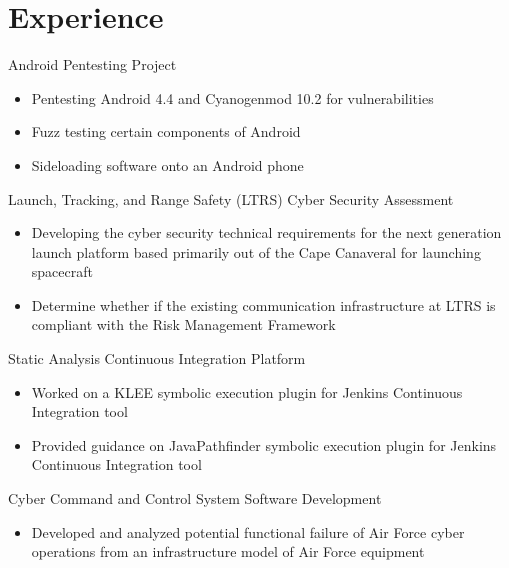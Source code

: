 \documentclass[letterpaper]{clinton-resume}
\begin{document}
\begin{minipage}[t]{0.66\textwidth}
\section{Experience}
\vspace{\topsep} 
\begin{tightitemize}
\item Android Pentesting Project
	\begin{itemize}
		\item Pentesting Android 4.4 and Cyanogenmod 10.2 for vulnerabilities
		\item Fuzz testing certain components of Android
		\item Sideloading software onto an Android phone
	\end{itemize}
\item Launch, Tracking, and Range Safety (LTRS) Cyber Security Assessment
	\begin{itemize}
		\item Developing the cyber security technical requirements for the next generation launch platform based primarily out of the Cape Canaveral for launching spacecraft
		\item Determine whether if the existing communication infrastructure at LTRS is compliant with the Risk Management Framework
	\end{itemize}
\end{tightitemize}
\vspace{\topsep} 
\begin{tightitemize}
\item Static Analysis Continuous Integration Platform
	\begin{itemize}
		\item Worked on a KLEE symbolic execution plugin for Jenkins Continuous Integration tool
		\item Provided guidance on JavaPathfinder symbolic execution plugin for Jenkins Continuous Integration tool
	\end{itemize}
\item Cyber Command and Control System Software Development
	\begin{itemize}
		\item  Developed and analyzed potential functional failure of Air Force cyber operations from an infrastructure model of Air Force equipment

\end{itemize}
\end{tightitemize}
\end{minipage}
\end{document}
